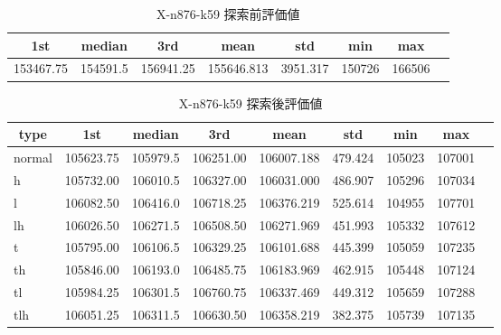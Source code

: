 \begin{table}[htbp]
    \caption{X-n876-k59 探索前評価値}
    \begin{tabular}{|l|l|l|l|l|l|l|l|}\hline
    \multicolumn{1}{|c|}{\textbf{1st}}
    &\multicolumn{1}{c|}{\textbf{median}}
    &\multicolumn{1}{c|}{\textbf{3rd}}
    &\multicolumn{1}{c|}{\textbf{mean}}
    &\multicolumn{1}{c|}{\textbf{std}}
    &\multicolumn{1}{c|}{\textbf{min}}
    &\multicolumn{1}{c|}{\textbf{max}}\\\hline
	153467.75 & 154591.5 & 156941.25 & 155646.813 & 3951.317 & 150726 & 166506\\\hline
	\end{tabular}
\end{table}
\begin{table}[htbp]
    \caption{X-n876-k59 探索後評価値}
    \begin{tabular}{|l|l|l|l|l|l|l|l|l|}\hline
    \multicolumn{1}{|c|}{\textbf{type}}
    &\multicolumn{1}{|c|}{\textbf{1st}}
    &\multicolumn{1}{c|}{\textbf{median}}
    &\multicolumn{1}{c|}{\textbf{3rd}}
    &\multicolumn{1}{c|}{\textbf{mean}}
    &\multicolumn{1}{c|}{\textbf{std}}
    &\multicolumn{1}{c|}{\textbf{min}}
    &\multicolumn{1}{c|}{\textbf{max}}\\\hline
	normal & 105623.75 & 105979.5 & 106251.00 & 106007.188 & 479.424 & 105023 & 107001\\\hline
	h & 105732.00 & 106010.5 & 106327.00 & 106031.000 & 486.907 & 105296 & 107034\\\hline
	l & 106082.50 & 106416.0 & 106718.25 & 106376.219 & 525.614 & 104955 & 107701\\\hline
	lh & 106026.50 & 106271.5 & 106508.50 & 106271.969 & 451.993 & 105332 & 107612\\\hline
	t & 105795.00 & 106106.5 & 106329.25 & 106101.688 & 445.399 & 105059 & 107235\\\hline
	th & 105846.00 & 106193.0 & 106485.75 & 106183.969 & 462.915 & 105448 & 107124\\\hline
	tl & 105984.25 & 106301.5 & 106760.75 & 106337.469 & 449.312 & 105659 & 107288\\\hline
	tlh & 106051.25 & 106311.5 & 106630.50 & 106358.219 & 382.375 & 105739 & 107135\\\hline
	\end{tabular}
\end{table}
